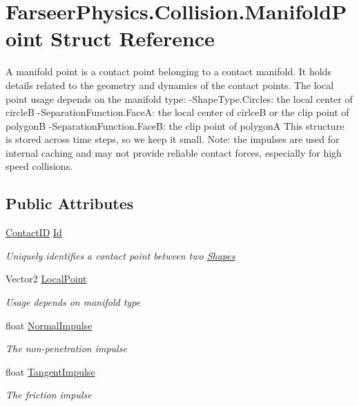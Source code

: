 \hypertarget{struct_farseer_physics_1_1_collision_1_1_manifold_point}{\section{Farseer\+Physics.\+Collision.\+Manifold\+Point Struct Reference}
\label{struct_farseer_physics_1_1_collision_1_1_manifold_point}
}


A manifold point is a contact point belonging to a contact manifold. It holds details related to the geometry and dynamics of the contact points. The local point usage depends on the manifold type\+: -\/\+Shape\+Type.\+Circles\+: the local center of circle\+B -\/\+Separation\+Function.\+Face\+A\+: the local center of cirlce\+B or the clip point of polygon\+B -\/\+Separation\+Function.\+Face\+B\+: the clip point of polygon\+A This structure is stored across time steps, so we keep it small. Note\+: the impulses are used for internal caching and may not provide reliable contact forces, especially for high speed collisions.  


\subsection*{Public Attributes}
\begin{DoxyCompactItemize}
\item 
\hyperlink{struct_farseer_physics_1_1_collision_1_1_contact_i_d}{Contact\+I\+D} \hyperlink{struct_farseer_physics_1_1_collision_1_1_manifold_point_ad77bd7009070038f52c49f35440bbd4d}{Id}
\begin{DoxyCompactList}\small\item\em Uniquely identifies a contact point between two \hyperlink{namespace_farseer_physics_1_1_collision_1_1_shapes}{Shapes} \end{DoxyCompactList}\item 
Vector2 \hyperlink{struct_farseer_physics_1_1_collision_1_1_manifold_point_a258a7ac06bb64e7341ccda001f60fc24}{Local\+Point}
\begin{DoxyCompactList}\small\item\em Usage depends on manifold type \end{DoxyCompactList}\item 
float \hyperlink{struct_farseer_physics_1_1_collision_1_1_manifold_point_a41a8ebd48f2347b232288b1860d44319}{Normal\+Impulse}
\begin{DoxyCompactList}\small\item\em The non-\/penetration impulse \end{DoxyCompactList}\item 
float \hyperlink{struct_farseer_physics_1_1_collision_1_1_manifold_point_a342d1b9cb4d364f85d89a580f83c224b}{Tangent\+Impulse}
\begin{DoxyCompactList}\small\item\em The friction impulse \end{DoxyCompactList}\end{DoxyCompactItemize}


